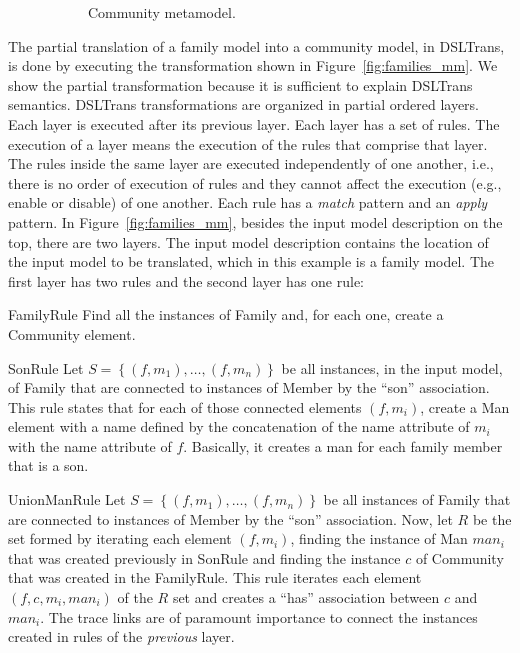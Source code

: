 \begin{figure}
\begin{subfigure}{0.5\linewidth}
                \caption{Community metamodel.}
                \label{fig:community_mm}
        \end{subfigure}%
        \caption{ }
        \label{fig:families_to_persons_metamodels}
\end{figure}

The partial translation of a family model into a community model, in DSLTrans,
is done by executing the transformation shown in
Figure~\ref{fig:families_mm}.
We show the partial transformation because it is sufficient to explain DSLTrans
semantics. DSLTrans transformations are organized in partial ordered
layers.
Each layer is executed after its previous layer. Each layer has a set of rules.
The execution of a layer means the execution of the rules that comprise that
layer.
The rules inside the same layer are executed independently of one another, i.e.,
there is no order of execution of rules and they cannot affect the execution
(e.g., enable or disable) of one another. Each rule has a \emph{match} pattern and an \emph{apply} pattern.
In Figure~\ref{fig:families_mm}, besides the input model description on the top,
there are two layers. The input model description contains the location of the
input model to be translated, which in this example is a family model. The first layer has two rules and the second layer
has one rule:
\begin{compactdesc}
	\item[FamilyRule] Find all the instances of Family and, for each one, create a Community element.
	\item[SonRule] Let $S = \left\{ (f, m_1) , \ldots , (f, m_n) \right\}$ be all instances, in the input model, of Family that are connected to instances of Member by the ``son'' association. This rule states that for each of those connected elements
$(f, m_i)$, create a Man element with a name defined by the concatenation of the name attribute of $m_i$ with the name attribute of $f$. Basically, it creates a man for each family member that is a son.
	\item[UnionManRule]  Let $S =
	\left\{ (f, m_1) , \ldots , (f, m_n) \right\}$ be all instances of Family that are connected to instances of Member by the ``son'' association.
	Now, let $R$ be the set formed by iterating each element $(f, m_i)$, finding
	the instance of Man ${man}_i$ that was created previously in SonRule and
	finding the instance $c$ of Community that was created in the FamilyRule. This
	rule iterates each element $(f, c, m_i, {man}_i)$ of the $R$ set and creates a
	``has'' association between $c$ and ${man}_i$. The trace links are of paramount importance to connect the instances created
	in rules of the \emph{previous} layer.
\end{compactdesc}

